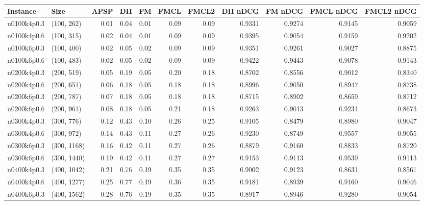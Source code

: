 \begin{tabular}{llrrrrrrrrr}
\toprule
   Instance &          Size &   APSP &     DH &    FM &  FMCL &  FMCL2 &  DH nDCG &  FM nDCG &  FMCL nDCG &  FMCL2 nDCG \\
\midrule
n0100k4p0.3 &    (100, 262) &   0.01 &   0.04 &  0.01 &  0.09 &   0.09 &   0.9331 &   0.9274 &     0.9145 &      0.9059 \\
n0100k4p0.6 &    (100, 315) &   0.02 &   0.04 &  0.01 &  0.09 &   0.09 &   0.9395 &   0.9054 &     0.9159 &      0.9202 \\
n0100k6p0.3 &    (100, 400) &   0.02 &   0.05 &  0.02 &  0.09 &   0.09 &   0.9351 &   0.9261 &     0.9027 &      0.8875 \\
n0100k6p0.6 &    (100, 483) &   0.02 &   0.05 &  0.02 &  0.09 &   0.09 &   0.9422 &   0.9443 &     0.9078 &      0.9143 \\
n0200k4p0.3 &    (200, 519) &   0.05 &   0.19 &  0.05 &  0.20 &   0.18 &   0.8702 &   0.8556 &     0.9012 &      0.8340 \\
n0200k4p0.6 &    (200, 651) &   0.06 &   0.18 &  0.05 &  0.18 &   0.18 &   0.8996 &   0.9050 &     0.8947 &      0.8738 \\
n0200k6p0.3 &    (200, 787) &   0.07 &   0.18 &  0.05 &  0.18 &   0.18 &   0.8715 &   0.8902 &     0.8659 &      0.8712 \\
n0200k6p0.6 &    (200, 961) &   0.08 &   0.18 &  0.05 &  0.21 &   0.18 &   0.9263 &   0.9013 &     0.9231 &      0.8673 \\
n0300k4p0.3 &    (300, 776) &   0.12 &   0.43 &  0.10 &  0.26 &   0.25 &   0.9105 &   0.8479 &     0.8980 &      0.9047 \\
n0300k4p0.6 &    (300, 972) &   0.14 &   0.43 &  0.11 &  0.27 &   0.26 &   0.9230 &   0.8749 &     0.9557 &      0.9055 \\
n0300k6p0.3 &   (300, 1168) &   0.16 &   0.42 &  0.11 &  0.27 &   0.26 &   0.8879 &   0.9160 &     0.8833 &      0.8720 \\
n0300k6p0.6 &   (300, 1440) &   0.19 &   0.42 &  0.11 &  0.27 &   0.27 &   0.9153 &   0.9113 &     0.9539 &      0.9113 \\
n0400k4p0.3 &   (400, 1042) &   0.21 &   0.76 &  0.19 &  0.35 &   0.35 &   0.9002 &   0.9123 &     0.8631 &      0.8561 \\
n0400k4p0.6 &   (400, 1277) &   0.25 &   0.77 &  0.19 &  0.36 &   0.35 &   0.9181 &   0.8939 &     0.9160 &      0.9046 \\
n0400k6p0.3 &   (400, 1562) &   0.28 &   0.76 &  0.19 &  0.35 &   0.35 &   0.8917 &   0.8946 &     0.9280 &      0.9054 \\

\end{tabular}
